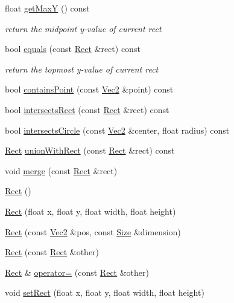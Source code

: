 \begin{DoxyCompactItemize}
float \hyperlink{classRect_ae508fa245f49f5cc691d2dc36fdd7a8c}{get\+MaxY} () const
\begin{DoxyCompactList}\small\item\em return the midpoint y-\/value of current rect \end{DoxyCompactList}\item 
bool \hyperlink{classRect_af18d9c2a452430601e398fec58f4c8d3}{equals} (const \hyperlink{classRect}{Rect} \&rect) const
\begin{DoxyCompactList}\small\item\em return the topmost y-\/value of current rect \end{DoxyCompactList}\item 
bool \hyperlink{classRect_ade04c4780618c8886ab11902b92a25ec}{contains\+Point} (const \hyperlink{classVec2}{Vec2} \&point) const
\item 
bool \hyperlink{classRect_a1cda3d61f31818b138c051135c5a3bdd}{intersects\+Rect} (const \hyperlink{classRect}{Rect} \&rect) const
\item 
bool \hyperlink{classRect_a14ae2011ca780e304387920a8ebb1538}{intersects\+Circle} (const \hyperlink{classVec2}{Vec2} \&center, float radius) const
\item 
\hyperlink{classRect}{Rect} \hyperlink{classRect_ab51a6068a355a826faa0bd03c381f1fa}{union\+With\+Rect} (const \hyperlink{classRect}{Rect} \&rect) const
\item 
void \hyperlink{classRect_aafc3d3683de418f92a7089c7b7a777e0}{merge} (const \hyperlink{classRect}{Rect} \&rect)
\item 
\hyperlink{classRect_a911e531b86de33734dd7de3456722115}{Rect} ()
\item 
\hyperlink{classRect_a2ccad9ce15ee46a8957448a0bafbb8e9}{Rect} (float x, float y, float width, float height)
\item 
\hyperlink{classRect_a83b42c791d8ce7b8c08356755abe295c}{Rect} (const \hyperlink{classVec2}{Vec2} \&pos, const \hyperlink{classSize}{Size} \&dimension)
\item 
\hyperlink{classRect_a82f6b6e265c6c9ef8c644e2d0660a2bb}{Rect} (const \hyperlink{classRect}{Rect} \&other)
\item 
\hyperlink{classRect}{Rect} \& \hyperlink{classRect_ab01255985652564479c2c5343dbca9a7}{operator=} (const \hyperlink{classRect}{Rect} \&other)
\item 
void \hyperlink{classRect_ab9d3a5d029bc97ff8763c9e2ec7ed2f7}{set\+Rect} (float x, float y, float width, float height)
\item 

\end{DoxyCompactItemize}
